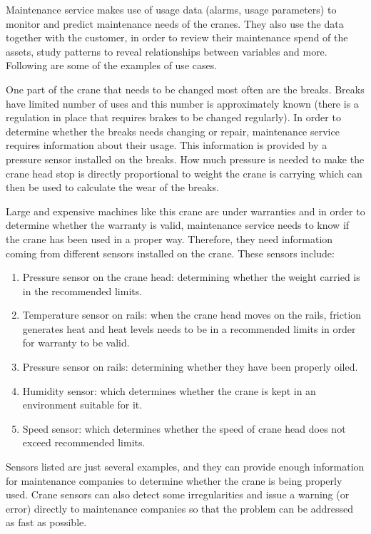 Maintenance service makes use of usage data (alarms, usage parameters) to monitor and predict maintenance needs of the cranes. They also use the data together with the customer, in order to review their maintenance spend of the assets, study patterns to reveal relationships between variables and more. Following are some of the examples of use cases.

One part of the crane that needs to be changed most often are the breaks.
Breaks have limited number of uses and this number is approximately known
(there is a regulation in place that requires brakes to be changed regularly).
In order to determine whether the breaks needs changing or repair, maintenance service requires information about their usage. This information is provided by a pressure sensor installed on the breaks. How much pressure is needed to make the crane head stop is directly proportional to weight the crane is carrying which can then be used to calculate the wear of the breaks.

Large and expensive machines like this crane are under warranties and in order to determine whether the warranty is valid, maintenance service needs to know if the crane has been used in a proper way. Therefore, they need information coming from different sensors installed on the crane. These sensors include: 

\begin{enumerate}
	\setlength{\itemsep}{1pt}
	\item Pressure sensor on the crane head: determining whether the weight carried is in the recommended limits.  
	\item Temperature sensor on rails: when the crane head moves on the rails, friction generates heat and heat levels needs to be in a recommended limits in order for warranty to be valid.
	\item Pressure sensor on rails: determining whether they have been properly oiled.
	\item Humidity sensor: which determines whether the crane is kept in an environment suitable for it.
	\item Speed sensor: which determines whether the speed of crane head does not exceed recommended limits.
\end{enumerate}

Sensors listed are just several examples, and they can provide enough information for maintenance companies to determine whether the crane is being properly used. Crane sensors can also 
detect some irregularities and issue a warning (or error) directly to maintenance companies so that the problem can be addressed as fast as possible. 

